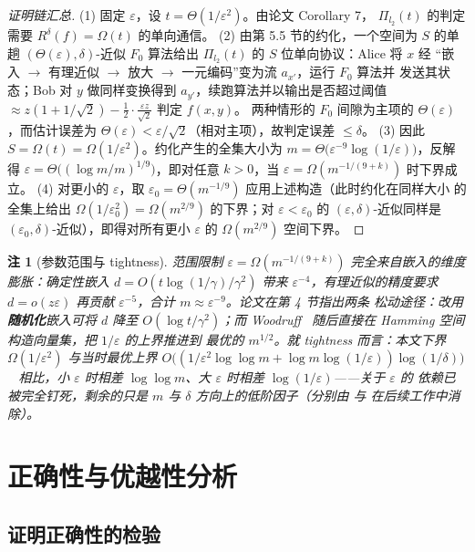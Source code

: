 \documentclass[UTF8, 11pt, a4paper, linestretch=1.15]{ctexart}
\theoremstyle{zhstyle}
\newtheorem{remark}{注}
\newcommand{\eps}{\varepsilon}
\newcommand{\Fzero}{F_0}
\begin{document}
	\begin{proof}[证明链汇总]
		(1) 固定 $\eps$，设 $t = \Theta(1/\eps^2)$。由论文 Corollary 7，
		$\Pi_{l_2}(t)$ 的判定需要 $R^{\delta}(f) = \Omega(t)$ 的单向通信。
		(2) 由第 5.5 节的约化，一个空间为 $S$ 的单趟 $(\Theta(\eps), \delta)$-近似 $\Fzero$
		算法给出 $\Pi_{l_2}(t)$ 的 $S$ 位单向协议：Alice 将 $x$ 经
		“嵌入 $\to$ 有理近似 $\to$ 放大 $\to$ 一元编码”变为流 $a_{x'}$，运行 $\Fzero$ 算法并
		发送其状态；Bob 对 $y$ 做同样变换得到 $a_{y'}$，续跑算法并以输出是否超过阈值
		$\approx z(1 + 1/\sqrt{2}) - \frac{1}{2}\cdot\frac{\eps z}{\sqrt{2}}$ 判定 $f(x,y)$。
		两种情形的 $\Fzero$ 间隙为主项的 $\Theta(\eps)$，而估计误差为 $\Theta(\eps) <
		\eps/\sqrt{2}$（相对主项），故判定误差 $\leq \delta$。
		(3) 因此 $S = \Omega(t) = \Omega(1/\eps^2)$。约化产生的全集大小为
		$m = \Theta\big(\eps^{-9}\log(1/\eps)\big)$，反解得
		$\eps = \Theta\big((\log m / m)^{1/9}\big)$，即对任意 $k > 0$，当
		$\eps = \Omega(m^{-1/(9+k)})$ 时下界成立。
		(4) 对更小的 $\eps$，取 $\eps_0 = \Theta(m^{-1/9})$ 应用上述构造（此时约化在同样大小
		的全集上给出 $\Omega(1/\eps_0^2) = \Omega(m^{2/9})$ 的下界；对 $\eps < \eps_0$ 的
		$(\eps,\delta)$-近似同样是 $(\eps_0, \delta)$-近似），即得对所有更小 $\eps$ 的
		$\Omega(m^{2/9})$ 空间下界。
	\end{proof}
	
	\begin{remark}[参数范围与 tightness]
		范围限制 $\eps = \Omega(m^{-1/(9+k)})$ 完全来自嵌入的维度膨胀：确定性嵌入
		$d = O(t\log(1/\gamma)/\gamma^2)$ 带来 $\eps^{-4}$，有理近似的精度要求
		$d = o(z\eps)$ 再贡献 $\eps^{-5}$，合计 $m \approx \eps^{-9}$。论文在第 4 节指出两条
		松动途径：改用\textbf{随机化}嵌入可将 $d$ 降至 $O(\log t / \gamma^2)$；而
		Woodruff~\cite{Woo04} 随后直接在 Hamming 空间构造向量集，把 $1/\eps$ 的上界推进到
		最优的 $m^{1/2}$。就 tightness 而言：本文下界 $\Omega(1/\eps^2)$ 与当时最优上界
		$O\big((1/\eps^2 \log\log m + \log m \log(1/\eps))\log(1/\delta)\big)$~\cite{BJKST02}
		相比，小 $\eps$ 时相差 $\log\log m$、大 $\eps$ 时相差 $\log(1/\eps)$——关于 $\eps$ 的
		依赖已被完全钉死，剩余的只是 $m$ 与 $\delta$ 方向上的低阶因子（分别由
		\cite{KNW10} 与 \cite{JW13, Bla18} 在后续工作中消除）。
	\end{remark}
	
	\section{正确性与优越性分析}
	
	\subsection{证明正确性的检验}
	
\end{document}
